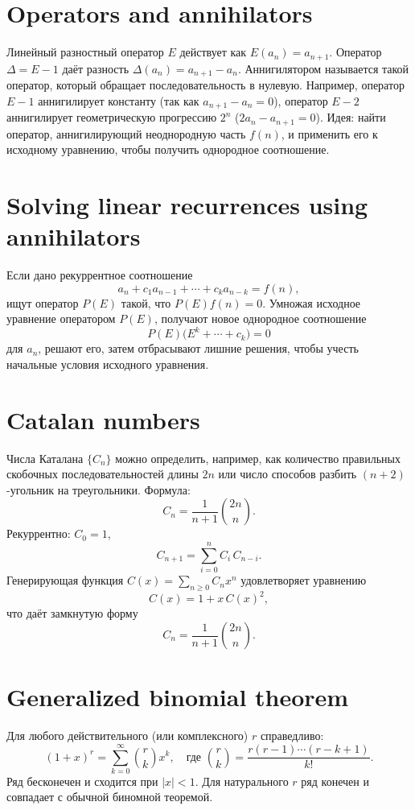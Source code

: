 \documentclass{article}
\begin{document}
	\section{Operators and annihilators}
	Линейный разностный оператор $E$ действует как $E(a_n)=a_{n+1}$. Оператор $\Delta = E-1$ даёт разность $\Delta(a_n)=a_{n+1}-a_n$. Аннигилятором называется такой оператор, который обращает последовательность в нулевую. Например, оператор $E-1$ аннигилирует константу (так как $a_{n+1}-a_n=0$), оператор $E-2$ аннигилирует геометрическую прогрессию $2^n$ ($2a_{n} - a_{n+1}=0$). Идея: найти оператор, аннигилирующий неоднородную часть $f(n)$, и применить его к исходному уравнению, чтобы получить однородное соотношение.
	
	\section{Solving linear recurrences using annihilators}
	Если дано рекуррентное соотношение 
	\[
	a_n + c_1 a_{n-1} + \cdots + c_k a_{n-k} = f(n),
	\]
	ищут оператор $P(E)$ такой, что $P(E)f(n)=0$. Умножая исходное уравнение оператором $P(E)$, получают новое однородное соотношение 
	\[
	P(E)\bigl(E^k + \cdots + c_k\bigr)=0
	\]
	для $a_n$, решают его, затем отбрасывают лишние решения, чтобы учесть начальные условия исходного уравнения.
	
	\section{Catalan numbers}
	Числа Каталана $\{C_n\}$ можно определить, например, как количество правильных скобочных последовательностей длины $2n$ или число способов разбить $(n+2)$-угольник на треугольники. Формула:
	\[
	C_n = \frac{1}{n+1}\binom{2n}{n}.
	\]
	Рекуррентно: $C_0=1$, 
	\[
	C_{n+1} = \sum_{i=0}^n C_i\,C_{n-i}.
	\]
	Генерирующая функция $C(x)=\sum_{n\ge0}C_n x^n$ удовлетворяет уравнению 
	\[
	C(x)=1 + x\,C(x)^2,
	\]
	что даёт замкнутую форму 
	\[
	C_n = \frac{1}{n+1}\binom{2n}{n}.
	\]
	
	\section{Generalized binomial theorem}
	Для любого действительного (или комплексного) $r$ справедливо:
	\[
	(1+x)^r = \sum_{k=0}^\infty \binom{r}{k} x^k, \quad \text{где } \binom{r}{k} = \frac{r(r-1)\cdots(r-k+1)}{k!}.
	\]
	Ряд бесконечен и сходится при $|x|<1$. Для натурального $r$ ряд конечен и совпадает с обычной биномной теоремой.
	
\end{document}
